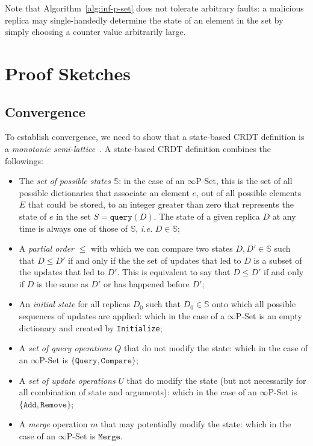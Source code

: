 \documentclass[11pt, oneside]{article}   	%
\begin{document}
Note that Algorithm~\ref{alg:inf-p-set} does not tolerate arbitrary faults: a malicious replica may single-handedly determine the state of an element in the set by simply choosing a counter value arbitrarily large.

\section{Proof Sketches}
\label{sec:proofs}

\subsection{Convergence}
\label{sec:proofs:convergence}

To establish convergence, we need to show that a state-based CRDT definition is a \textit{monotonic semi-lattice}~\cite{shapiro:hal-00932836}. A state-based CRDT definition combines the followings:
\begin{itemize}
	\item The \textit{set of possible states} $\mathds{S}$: in the case of an $\infty$P-Set, this is the set of all possible dictionaries that associate an element $e$, out of all possible elements $E$ that could be stored, to an integer greater than zero that represents the state of $e$ in the set $S = \texttt{query}(D)$. The state of a given replica $D$ at any time is always one of those of $\mathds{S}$, \textit{i.e.} $D \in \mathds{S}$;
	\item A \textit{partial order} $\leq$ with which we can compare two states $D, D' \in \mathds{S}$ such that $D \leq D'$ if and only if the the set of updates that led to $D$ is a subset of the updates that led to $D'$. This is equivalent to say that $D \leq D'$ if and only if $D$ is the same as $D'$ or has happened before $D'$;
	\item An \textit{initial state} for all replicas $D_0$ such that $D_0 \in \mathds{S}$ onto which all possible sequences of updates are applied: which in the case of a $\infty$P-Set is an empty dictionary and created by \texttt{Initialize};
	\item A \textit{set of query operations} $Q$ that do not modify the state: which in the case of an $\infty$P-Set is $\{ \texttt{Query}, \texttt{Compare} \}$;
	\item A \textit{set of update operations} $U$ that do modify the state (but not necessarily for all combination of state and arguments): which in the case of an $\infty$P-Set is $\{ \texttt{Add}, \texttt{Remove} \}$;
	\item A \textit{merge} operation $m$ that may potentially modify the state: which in the case of an $\infty$P-Set is ${ \texttt{Merge} }$.
\end{itemize}
\end{document}
